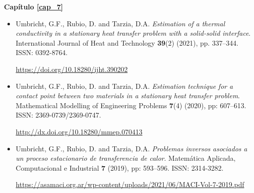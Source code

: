 {\bf Cap\'itulo \ref{cap_7}} 

\begin{itemize}

\item{Umbricht, G.F., Rubio, D. and Tarzia, D.A. {\em Estimation of a thermal conductivity in a stationary heat transfer problem with a solid-solid interface}. International Journal of Heat and Technology {\bf 39}(2) (2021), pp. 337--344. ISSN: 0392-8764.}

\url{https://doi.org/10.18280/ijht.390202}
%
%
\item{Umbricht, G.F., Rubio, D. and Tarzia, D.A. {\em Estimation technique for a contact point between two materials in a stationary heat transfer problem}. Mathematical Modelling of Engineering Problems {\bf 7}(4) (2020), pp: 607--613. ISSN: 2369-0739/2369-0747.}

\url{http://dx.doi.org/10.18280/mmep.070413}
%
%
\item{Umbricht, G.F., Rubio, D. and Tarzia, D.A. {\em Problemas inversos asociados a un proceso estacionario de transferencia de calor}. Matem\'atica Aplicada, Computacional e Industrial {\bf 7} (2019), pp: 593--596. ISSN: 2314-3282.}

\sloppy
\url{https://asamaci.org.ar/wp-content/uploads/2021/06/MACI-Vol-7-2019.pdf}

\end{itemize}



















		
	
	



